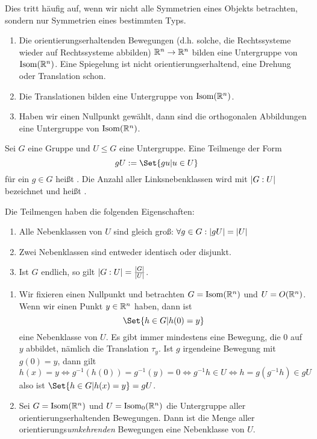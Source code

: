 \begin{example}
Dies tritt häufig auf, wenn wir nicht alle Symmetrien eines Objekts betrachten, sondern nur Symmetrien eines bestimmten Typs.

\begin{enumerate}
\item Die orientierungserhaltenden Bewegungen (d.h. solche, die Rechtssysteme wieder auf Rechtssysteme abbilden) $\mathbb{R}^n\to\mathbb{R}^n$ bilden eine Untergruppe von $\operatorname{Isom}(\mathbb{R}^n)$. Eine Spiegelung ist nicht orientierungserhaltend, eine Drehung oder Translation schon.
\item Die Translationen bilden eine Untergruppe von $\operatorname{Isom}(\mathbb{R}^n)$.
\item Haben wir einen Nullpunkt gewählt, dann sind die orthogonalen Abbildungen eine Untergruppe von $\operatorname{Isom}(\mathbb{R}^n)$.
\end{enumerate}
\end{example}

\begin{theoremdef}
Sei $G$ eine Gruppe und $U\leq G$ eine Untergruppe. Eine Teilmenge der Form
\[gU := \Set{gu | u\in U}\]
für ein $g\in G$ heißt . Die Anzahl aller Linksnebenklassen wird mit $\lvert G:U\rvert$ bezeichnet und heißt .

Die Teilmengen haben die folgenden Eigenschaften:
\begin{enumerate}
\item Alle Nebenklassen von $U$ sind gleich groß: $\forall g\in G: \lvert gU\rvert = \lvert U\rvert$
\item Zwei Nebenklassen sind entweder identisch oder disjunkt.
\item Ist $G$ endlich, so gilt $\lvert G:U\rvert = \frac{\lvert G\rvert}{\lvert U\rvert}$.
\end{enumerate}
\end{theoremdef}

\begin{example}
\begin{enumerate}
\item Wir fixieren einen Nullpunkt und betrachten $G=\operatorname{Isom}(\mathbb{R}^n)$ und $U=O(\mathbb{R}^n)$. Wenn wir einen Punkt $y\in\mathbb{R}^n$ haben, dann ist
\[\Set{h\in G | h(0)=y}\]
eine Nebenklasse von $U$. Es gibt immer mindestens eine Bewegung, die $0$ auf $y$ abbildet, nämlich die Translation $\tau_y$. Ist $g$ irgendeine Bewegung mit $g(0)=y$, dann gilt
\[h(x)=y \iff g^{-1}(h(0)) = g^{-1}(y) = 0 \iff g^{-1}h\in U \iff h=g(g^{-1}h)\in gU\]
also ist $\Set{h\in G | h(x)=y} = gU$.
\item Sei $G=\operatorname{Isom}(\mathbb{R}^n)$ und $U=\operatorname{Isom}_0(\mathbb{R}^n)$ die Untergruppe aller orientierungserhaltenden Bewegungen. Dann ist die Menge aller orientierungs\emph{umkehrenden} Bewegungen eine Nebenklasse von $U$.
\end{enumerate}
\end{example}

